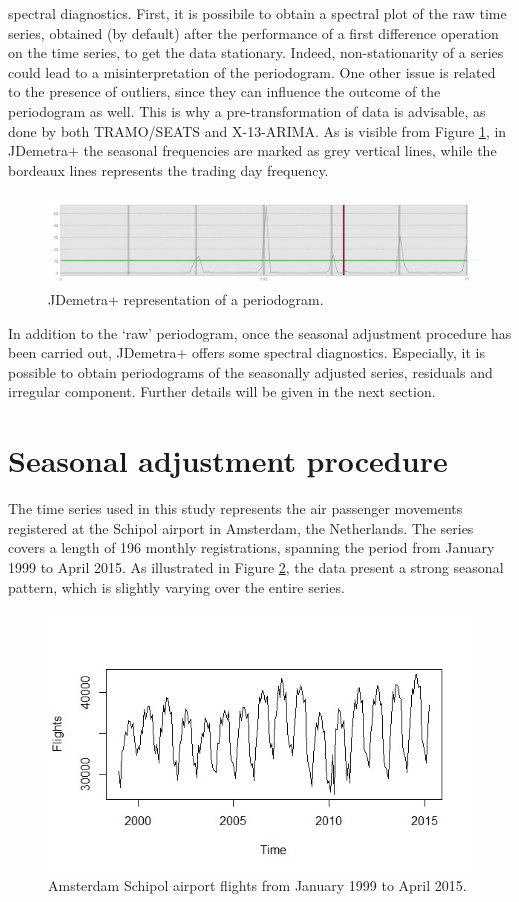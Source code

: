 \documentclass[english,blauw]{cbsdiscussionpaper}
\begin{document}
spectral diagnostics. First, it is possibile to obtain a spectral plot of the raw time series, obtained (by default) after the performance of a first difference operation on the time series, to get the data stationary. Indeed, non-stationarity of a series could lead to a misinterpretation of the periodogram.  One other issue is related to the presence of outliers, since they can influence the outcome of the periodogram as well. This is why a pre-transformation of data is advisable, as done by both TRAMO/SEATS and X-13-ARIMA.  As is visible from Figure \ref{fig:raw}, in JDemetra+ the seasonal frequencies are marked as grey vertical lines, while the bordeaux lines represents the trading day frequency.
\begin{figure}[h]
\includegraphics[width=\linewidth]{../images/capitolo2/raw.jpg}
\caption{JDemetra+ representation of a periodogram.}
\label{fig:raw}
\end{figure}
In addition to the ‘raw’ periodogram, once the seasonal adjustment procedure has been carried out, JDemetra+ offers some spectral diagnostics. Especially, it is possible to obtain periodograms of the seasonally adjusted series, residuals and irregular component. Further details will be given in the next section.
\section{Seasonal adjustment procedure}
The time series used in this study represents the air passenger movements registered at the Schipol airport in Amsterdam, the Netherlands. The series covers a length of 196 monthly registrations, spanning the period from January 1999 to April 2015. As illustrated in Figure \ref{fig:series}, the data present a strong seasonal pattern, which is slightly varying over the entire series.
\begin{figure}[h]
 \includegraphics[width=\linewidth]{../images/capitolo3/series.jpg}
 \caption{Amsterdam Schipol airport flights from January 1999 to April 2015.}
 \label{fig:series}
\end{figure}
\end{document}
